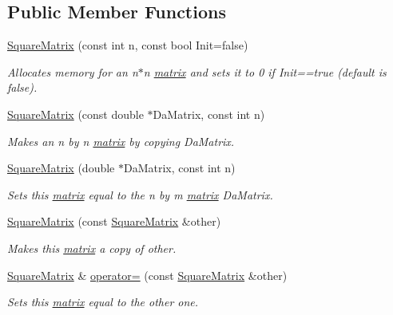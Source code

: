 \subsection*{Public Member Functions}
\begin{DoxyCompactItemize}
\item 
\hyperlink{classJKBuilder_1_1SquareMatrix_af755a00337cbb65c3456c2d2c80cdb08}{SquareMatrix} (const int n, const bool Init=false)
\begin{DoxyCompactList}\small\item\em Allocates memory for an n$\ast$n \hyperlink{classJKBuilder_1_1matrix}{matrix} and sets it to 0 if Init==true (default is false). \item\end{DoxyCompactList}\item 
\hyperlink{classJKBuilder_1_1SquareMatrix_a9b4d71581dc48d35a53e3e63a86be2b0}{SquareMatrix} (const double $\ast$DaMatrix, const int n)
\begin{DoxyCompactList}\small\item\em Makes an n by n \hyperlink{classJKBuilder_1_1matrix}{matrix} by copying DaMatrix. \item\end{DoxyCompactList}\item 
\hyperlink{classJKBuilder_1_1SquareMatrix_adfb34b7570c1de2cf7b96ba76fde9b01}{SquareMatrix} (double $\ast$DaMatrix, const int n)
\begin{DoxyCompactList}\small\item\em Sets this \hyperlink{classJKBuilder_1_1matrix}{matrix} equal to the n by m \hyperlink{classJKBuilder_1_1matrix}{matrix} DaMatrix. \item\end{DoxyCompactList}\item 
\hyperlink{classJKBuilder_1_1SquareMatrix_a2ef83e63ad627a33ea913bc245f00f43}{SquareMatrix} (const \hyperlink{classJKBuilder_1_1SquareMatrix}{SquareMatrix} \&other)
\begin{DoxyCompactList}\small\item\em Makes this \hyperlink{classJKBuilder_1_1matrix}{matrix} a copy of other. \item\end{DoxyCompactList}\item 
\hyperlink{classJKBuilder_1_1SquareMatrix}{SquareMatrix} \& \hyperlink{classJKBuilder_1_1SquareMatrix_ad78e5a12d26f1984d77a57095bc4d181}{operator=} (const \hyperlink{classJKBuilder_1_1SquareMatrix}{SquareMatrix} \&other)
\begin{DoxyCompactList}\small\item\em Sets this \hyperlink{classJKBuilder_1_1matrix}{matrix} equal to the other one. \item\end{DoxyCompactList}\item 

\end{DoxyCompactItemize}
